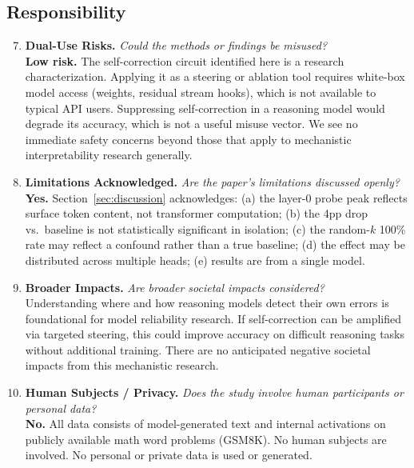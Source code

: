 \subsection*{Responsibility}

\begin{enumerate}
\setcounter{enumi}{6}

\item \textbf{Dual-Use Risks.}
\textit{Could the methods or findings be misused?} \\
\textbf{Low risk.} The self-correction circuit identified here is a research characterization. Applying it as a steering or ablation tool requires white-box model access (weights, residual stream hooks), which is not available to typical API users. Suppressing self-correction in a reasoning model would degrade its accuracy, which is not a useful misuse vector. We see no immediate safety concerns beyond those that apply to mechanistic interpretability research generally.

\item \textbf{Limitations Acknowledged.}
\textit{Are the paper's limitations discussed openly?} \\
\textbf{Yes.} Section~\ref{sec:discussion} acknowledges: (a) the layer-0 probe peak reflects surface token content, not transformer computation; (b) the 4pp drop vs.\ baseline is not statistically significant in isolation; (c) the random-$k$ 100\% rate may reflect a confound rather than a true baseline; (d) the effect may be distributed across multiple heads; (e) results are from a single model.

\item \textbf{Broader Impacts.}
\textit{Are broader societal impacts considered?} \\
Understanding where and how reasoning models detect their own errors is foundational for model reliability research. If self-correction can be amplified via targeted steering, this could improve accuracy on difficult reasoning tasks without additional training. There are no anticipated negative societal impacts from this mechanistic research.

\item \textbf{Human Subjects / Privacy.}
\textit{Does the study involve human participants or personal data?} \\
\textbf{No.} All data consists of model-generated text and internal activations on publicly available math word problems (GSM8K). No human subjects are involved. No personal or private data is used or generated.

\end{enumerate}
